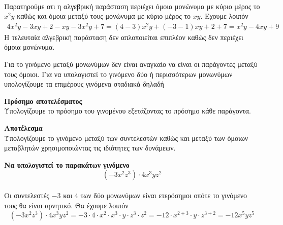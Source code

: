 \documentclass[twoside,nofonts,internet,methodoi]{thewria}
\begin{document}
\lysh\\
Παρατηρούμε οτι η αλγεβρική παράσταση περιέχει όμοια μονώνυμα με κύριο μέρος το $ x^2y $ καθώς και όμοια μεταξύ τους μονώνυμα με κύριο μέρος το $ xy $. Έχουμε λοιπόν
\begin{gather*}
4x^2y-3xy+2-xy-3x^2y+7=(4-3)x^2y+(-3-1)xy+2+7=x^2y-4xy+9
\end{gather*}
Η τελευταία αλγεβρική παράσταση δεν απλοποιείται επιπλέον καθώς δεν περιέχει όμοια μονώνυμα.
\begin{Methodos}
Για το γινόμενο μεταξύ μονωνύμων δεν είναι αναγκαίο να είναι οι παράγοντες μεταξύ τους όμοιοι. Για να υπολογιστεί το γινόμενο δύο ή περισσότερων μονωνύμων υπολογίζουμε τα επιμέρους γινόμενα σταδιακά δηλαδή
\begin{bhma}
\item \textbf{Πρόσημο αποτελέσματος}\\
Υπολογίζουμε το πρόσημο του γινομένου εξετάζοντας το πρόσημο κάθε παράγοντα.
\item \textbf{Αποτέλεσμα}\\
Υπολογίζουμε το γινόμενο μεταξύ των συντελεστών καθώς και μεταξύ των όμοιων μεταβλητών χρησιμοποιώντας τις ιδιότητες των δυνάμεων.
\end{bhma}
\end{Methodos}
\textbf{Να υπολογιστεί το παρακάτων γινόμενο}
{\boldmath\[ \left( -3x^2z^3\right) \cdot4x^3yz^2 \]}
\lysh\\
Οι συντελεστές $ -3 $ και $ 4 $ των δύο μονωνύμων είναι ετερόσημοι οπότε το γινόμενο τους θα είναι αρνητικό. Θα έχουμε λοιπόν
\[ \left( -3x^2z^3\right) \cdot4x^3yz^2=-3\cdot4\cdot x^2\cdot x^3\cdot y\cdot z^3\cdot z^2=-12\cdot x^{2+3}\cdot y\cdot z^{3+2}=-12x^5yz^5 \]
\begin{Methodos}

\end{Methodos}
\end{document}
